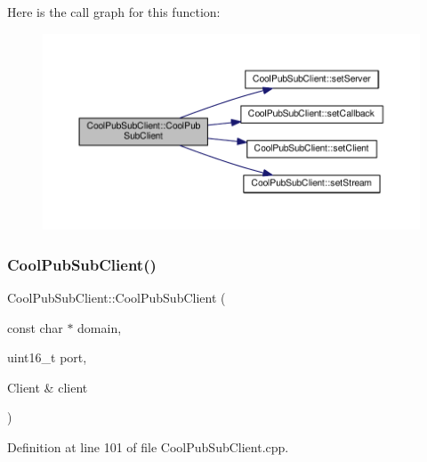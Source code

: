 Here is the call graph for this function\+:
\nopagebreak
\begin{figure}[H]
\begin{center}
\leavevmode
\includegraphics[width=350pt]{class_cool_pub_sub_client_a08309a2cf058099fa5c96c198f777647_cgraph}
\end{center}
\end{figure}
\mbox{\label{class_cool_pub_sub_client_a469eefe7429f0cbb6d7d443b52488411}} 
\subsubsection{\texorpdfstring{Cool\+Pub\+Sub\+Client()}{CoolPubSubClient()}\hspace{0.1cm}{\footnotesize\ttfamily [11/14]}}
{\footnotesize\ttfamily Cool\+Pub\+Sub\+Client\+::\+Cool\+Pub\+Sub\+Client (\begin{DoxyParamCaption}\item[{const char $\ast$}]{domain,  }\item[{uint16\+\_\+t}]{port,  }\item[{Client \&}]{client }\end{DoxyParamCaption})}



Definition at line 101 of file Cool\+Pub\+Sub\+Client.\+cpp.

